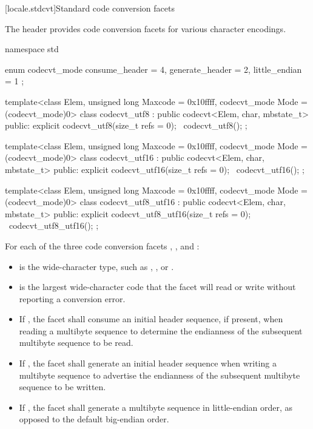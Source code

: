 [locale.stdcvt]{Standard code conversion facets}

\pnum
The header  provides code conversion facets for various character encodings.

\pnum
{}

%
\begin{codeblock}
namespace std {
  enum codecvt_mode {
    consume_header = 4,
    generate_header = 2,
    little_endian = 1
  };

  template<class Elem, unsigned long Maxcode = 0x10ffff,
    codecvt_mode Mode = (codecvt_mode)0>
  class codecvt_utf8
    : public codecvt<Elem, char, mbstate_t> {
  public:
    explicit codecvt_utf8(size_t refs = 0);
    ~codecvt_utf8();
  };

  template<class Elem, unsigned long Maxcode = 0x10ffff,
    codecvt_mode Mode = (codecvt_mode)0>
  class codecvt_utf16
    : public codecvt<Elem, char, mbstate_t> {
  public:
    explicit codecvt_utf16(size_t refs = 0);
    ~codecvt_utf16();
  };

  template<class Elem, unsigned long Maxcode = 0x10ffff,
    codecvt_mode Mode = (codecvt_mode)0>
  class codecvt_utf8_utf16
    : public codecvt<Elem, char, mbstate_t> {
  public:
    explicit codecvt_utf8_utf16(size_t refs = 0);
    ~codecvt_utf8_utf16();
  };
}
\end{codeblock}

\pnum
For each of the three code conversion facets , , and :

\begin{itemize}
\item {} is the wide-character type, such as , , or .
\item {} is the largest wide-character code that the facet will read or write without reporting a conversion error.
\item If , the facet shall consume an initial header sequence, if present, when reading a multibyte sequence to determine the endianness of the subsequent multibyte sequence to be read.
\item If , the facet shall generate an initial header sequence when writing a multibyte sequence to advertise the endianness of the subsequent multibyte sequence to be written.
\item If , the facet shall generate a multibyte sequence in little-endian order, as opposed to the default big-endian order.
\end{itemize}

